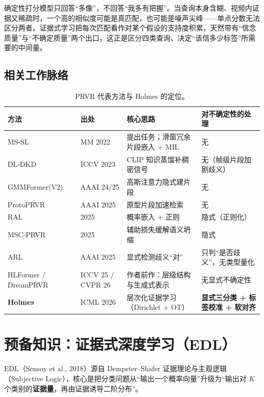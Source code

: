 \documentclass[11pt,a4paper,UTF8,fontset=windows]{ctexart}
\newcommand{\term}[1]{\textbf{#1}}
\begin{document}
\begin{thinkbox}
确定性打分模型只回答“多像”，不回答“我多有把握”。当查询本身含糊、视频内证据又稀疏时，一个高的相似度可能是真匹配，也可能是噪声尖峰——单点分数无法区分两者。证据式学习把每次匹配看作对某个假设的支持度积累，天然带有“信念质量”与“不确定质量”两个出口，这正是区分四类查询、决定“该信多少标签”所需要的中间量。
\end{thinkbox}

\subsection{相关工作脉络}

\begin{table}[h]
\centering
\small
\begin{tabular}{@{}llll@{}}
\toprule
方法 & 出处 & 核心思路 & 对不确定性的处理 \\
\midrule
MS-SL & MM 2022 & 提出任务；滑窗冗余片段嵌入 + MIL & 无 \\
DL-DKD & ICCV 2023 & CLIP 知识蒸馏补稠密信号 & 无（帧级片段加剧歧义） \\
GMMFormer(V2) & AAAI 24/25 & 高斯注意力隐式建片段 & 无 \\
ProtoPRVR & AAAI 2025 & 原型片段加速检索 & 无 \\
RAL & 2025 & 概率嵌入 + 正则 & 隐式（正则化） \\
MSC-PRVR & 2025 & 辅助损失缓解语义坍缩 & 隐式 \\
ARL & AAAI 2025 & 显式检测歧义“对” & 只判“是否歧义”，无类型量化 \\
HLFormer / DreamPRVR & ICCV 25 / CVPR 26 & 作者前作：层级结构与生成式表示 & 无显式不确定性 \\
\midrule
\term{Holmes} & ICML 2026 & 层次化证据学习（Dirichlet + OT） & \term{显式三分类 + 标签校准 + 软对齐} \\
\bottomrule
\end{tabular}
\caption{PRVR 代表方法与 Holmes 的定位。}
\end{table}

\section{预备知识：证据式深度学习（EDL）}

EDL（Sensoy et al., 2018）源自 Dempster--Shafer 证据理论与主观逻辑（Subjective Logic），核心是把分类问题从“输出一个概率向量”升级为“输出对 $K$ 个类别的\term{证据量}，再由证据诱导二阶分布”。
\end{document}
